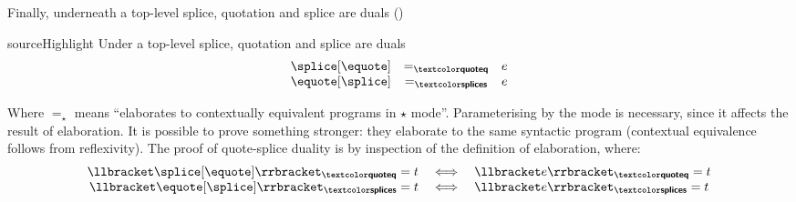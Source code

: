 
Finally, underneath a top-level splice, quotation and splice are duals ()

\begin{theorem}{sourceHighlight}\label{thm:quote-splice-duality}
  Under a top-level splice, quotation and splice are duals
  \[\begin{array}{rcl}
\splice[{\equote}] & =_{\quotemode{}} & e \\
\equote[{\splice}] & =_{\splicemode{}} & e
\end{array}
\]
\end{theorem}
Where $=_{\star}$ means ``elaborates to contextually equivalent \coreLang{} programs in $\star$ mode''. Parameterising by the mode is necessary, since it affects the result of elaboration. It is possible to prove something stronger: they elaborate to the same syntactic \coreLang{} program (contextual equivalence follows from reflexivity). The proof of quote-splice duality is by inspection of the definition of elaboration, where:
\[\begin{array}{rcl}  
  \elaborate{\splice[{\equote}]}_{\quotemode{}} = t & \iff & \elaborate{e}_{\quotemode{}} = t\\
  \elaborate{\equote[{\splice}]}_{\splicemode{}} = t & \iff & \elaborate{e}_{\splicemode{}} = t
\end{array}
  \]


